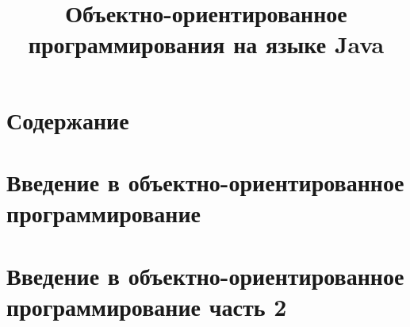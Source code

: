 \documentclass[hyperref={unicode,bookmarks=true}]{beamer}
\title{Объектно-ориентированное программирования на языке Java}
\begin{document}
\frame{\titlepage}

\section*{Содержание}
\frame{\tableofcontents}

\section{Введение в объектно-ориентированное программирование}


\section{Введение в объектно-ориентированное программирование часть 2}

\end{document}
